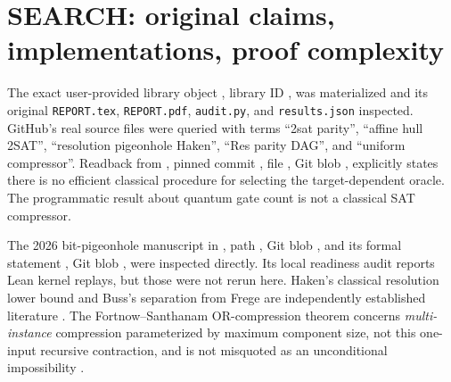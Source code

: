 \documentclass[11pt]{article}
\begin{document}
\section{SEARCH: original claims, implementations, proof complexity}
The exact user-provided library object , library ID , was materialized and its original \texttt{REPORT.tex}, \texttt{REPORT.pdf}, \texttt{audit.py}, and \texttt{results.json} inspected. GitHub's real source files were queried with terms ``2sat parity'', ``affine hull 2SAT'', ``resolution pigeonhole Haken'', ``Res parity DAG'', and ``uniform compressor''. Readback from , pinned commit \texttt{}, file , Git blob \texttt{}, explicitly states there is no efficient classical procedure for selecting the target-dependent oracle. The programmatic result about quantum gate count is not a classical SAT compressor.

The 2026 bit-pigeonhole manuscript in , path , Git blob \texttt{}, and its formal statement , Git blob \texttt{}, were inspected directly. Its local readiness audit reports Lean kernel replays, but those were not rerun here. Haken's classical resolution lower bound and Buss's separation from Frege are independently established literature \cite{haken1985,buss1987}. The Fortnow--Santhanam OR-compression theorem concerns \emph{multi-instance} compression parameterized by maximum component size, not this one-input recursive contraction, and is not misquoted as an unconditional impossibility \cite{fortnow2011}.
\end{document}
